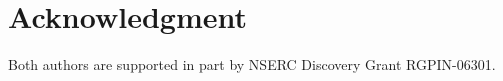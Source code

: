 \documentclass[letterpaper,11pt]{article}
\newtheorem{cor}[theorem]{Corollary}
\theoremstyle{definition}
\begin{document}
\section{Acknowledgment}
Both authors are supported in part by NSERC Discovery Grant RGPIN-06301.


\end{document}
